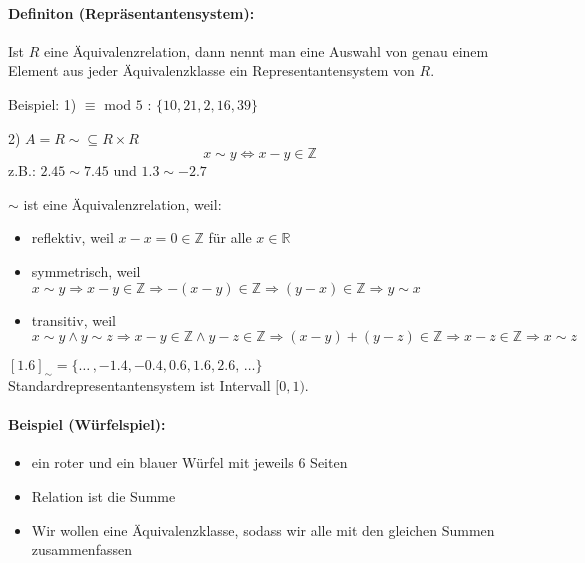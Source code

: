\paragraph{Definiton (Repr\"asentantensystem): }Ist $R$ eine Äquivalenzrelation, dann nennt man eine Auswahl von genau einem Element aus jeder Äquivalenzklasse ein Representantensystem von $R$.

Beispiel: 1) $\equiv$ mod $5$ : $\{10,21,2,16,39\}$


2) $A=R \sim \subseteq R \times R$
\[
x\sim y \Leftrightarrow x-y \in \mathbb{Z}
\]
z.B.: $2.45 \sim 7.45$ und $1.3 \sim -2.7$

$\sim$ ist eine Äquivalenzrelation, weil:
\begin{itemize}
\item reflektiv, weil $x-x = 0 \in \mathbb{Z}$ für alle $x\in\mathbb{R}$
\item symmetrisch, weil $x\sim y \Rightarrow x-y \in \mathbb{Z} \Rightarrow -(x-y) \in \mathbb{Z} \Rightarrow  (y-x) \in \mathbb{Z} \Rightarrow y\sim x$
\item transitiv, weil $x\sim y \land y\sim z \Rightarrow x-y \in \mathbb{Z} \land y-z \in \mathbb{Z} \Rightarrow (x-y)+(y-z)\in \mathbb{Z} \Rightarrow x-z \in \mathbb{Z} \Rightarrow x\sim z$
\end{itemize}

$[1.6]_{\sim} = \{ \ldots\, , -1.4, -0.4, 0.6, 1.6, 2.6,\, \ldots \}$\\
Standardrepresentantensystem ist Intervall $[0,1)$.


\paragraph{Beispiel (Würfelspiel): }
\begin{itemize}
\item ein roter und ein blauer Würfel mit jeweils $6$ Seiten
\item Relation ist die Summe
\item Wir wollen eine Äquivalenzklasse, sodass wir alle mit den gleichen Summen zusammenfassen
\end{itemize}

\newpage
